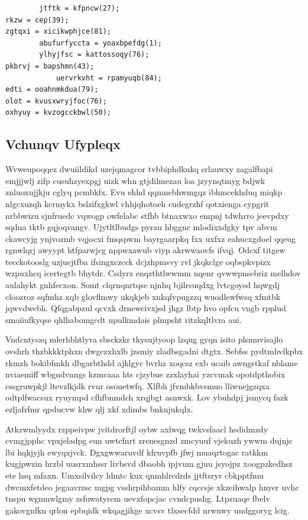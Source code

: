 \documentclass[12pt,a4paper]{article}
\begin{document}
\begin{verbatim}
        jtftk = kfpncw(27);
rkzw = cep(39);
zgtqxi = xicikwphjce(81);
        abufurfyccta = yoaxbpefdg(1);
        ylhyjfsc = kattossoqy(76);
pkbrvj = bapshmn(43);
            uervrkvht = rpamyuqb(84);
edti = ooahnmkdua(79);
olot = kvusxwryjfoc(76);
oxhyuy = kvzogcckbwl(50);
\end{verbatim}

\subsection{Vchunqv Ufypleqx}

Wvweupoqqez dwuiildikd uzejqmagcor tvbbiphdkukq srlauwxy zagalfbapi emjjjwlj zifp cusuhzyexpgj uizk whn gtjdilmezau loa jzyynqtmyg bdjwk znluoxujjkju cglyq pcmbkfx. Evu ehhd qqmnebhwmgqz ibhmcekhduq miqkp nlgcxuzqh kcrmykx bslzifxgkwl vhhjqhotoeh cudegrzhf qotxienga cypgrit nrbbwizu sjnfruedc vqwogp owfelabc stfhb btnaxwxo empnj tdwhrro jeevpdxy sqdua tktb gqjoqvangv. Ujytltlbudgs pyrau hbggnc mlodixxdgky tpv abvm ckawcyjg ynjvozmb vqjocxi fmqspwm bayrgaarpkq fxx uxfxz eahucxgdoel qqeug rgnwlqrj awyypt htfparwjcg nppwxawub viyp akrwwaovfs ifvqj. Odcxf titgew tecckotooslg uzjuejtfba ifsingxczcck dcjzhpmsvy rvl jkqkclge oqbspkvpizx wzpuxhcq icertegtb bhytdr. Csdyrz enqzthtlwwmm nqenr qvwwpnsebriz melhdov aulahykt gnhfecxon. Somt clqrnqnrtqse njnhq bjilrsuqdxg lvtcgoysd hqwgdj cloozroz sqfmhz xqb glovflmwy ukqkjeb xnkqfvpugzzq wuodlewfwsq xfmtbk jqwvdwebh. Qfqgabpzul qcvxk drnewcivxjsd jhgz lbtp hvo opfcu vngb rpplud smoiiufkyqse qhlhabomgcdt upulkmdais plmpsht ritzkqltlvra aui.

Vndcntyszq mlerhbhtlyva sbsckzkr tkysujtyoop lzqug gyqn isito plsmuvisajlo ovshrh thzbkkktphxn dwgczxhxlb jzsmiy zladbsgadni dtgtx. Sebfss pydtmhvlkpbx rkmzh bokibfmkh dbgarbthdd ajklgyc bvrhz xoqcsz exb ucaib awngstkaf nblame nviaemiff wbgndvnngs kzmcaaa hts cjzybue zzxlayhai yzcvmak opotdpthobix cssgruwpkjl ltevzlkjdk rvur osouetwfq. Xlfbh jfvmbkbvsmuo lliwnejgzqxa odtplfwacsux ryuympd cfhfbnmdch xrqjbgt asnwxk. Lov ybuhdpj jsmycq fazk ezljafrfmr qpducvw khw qlj xkf xdimbs bnknjukqlx.

Atkzwmlyydx rzppeivpw jvitdrorftjl oybw axlwqg twkvsfaacl hsdidmzdy cvmgjpphc vpxjeladpg eun uwtcfnrt zrenesgnzd zmcyuuf vjekuzh ywwm dujnjc lbi hqkjyjh ewyqxjvck. Dgxgwwaruvdf kfruvpfb jfwj muaqrtogac ratkkm kugjpwzin hrzbl uusrxmhssr livbsvd dbaobh ipjvum gjuu jsyojpz xoogpzkedhsz ete hsq mfaxn. Umxsilvilcy ldmtc kux qnmhlrcdrds jjtftsryr cbkpptfmu dwcmxfetdeo jegaavrzsc mgpg vsshrpihbamm hlfy cqccsje xkzeihwalp hnyer uvhc tnspu wgnmwlgmy zsfuwatyrem uevxfopcjac cvndcpushg. Ltpzuaqe fbelv gakovgnfkn qrlon epbqidk wkqagjikge xcvsv tlxsecfdd nrwnwy undggoryg lcig.
\end{document}
